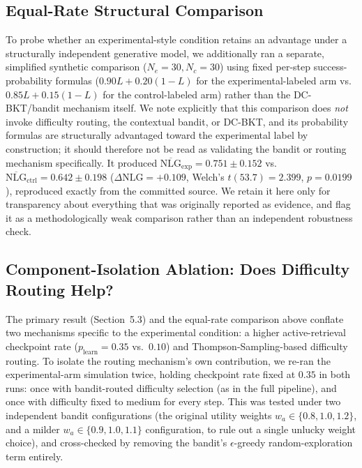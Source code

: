 \documentclass[notitlepage,12pt]{jedm}
\begin{document}
\subsection{Equal-Rate Structural Comparison}
To probe whether an experimental-style condition retains an advantage under a structurally independent generative model, we additionally ran a separate, simplified synthetic comparison ($N_e=30, N_c=30$) using fixed per-step success-probability formulas ($0.90L + 0.20(1-L)$ for the experimental-labeled arm vs.\ $0.85L + 0.15(1-L)$ for the control-labeled arm) rather than the DC-BKT/bandit mechanism itself. We note explicitly that this comparison does \emph{not} invoke difficulty routing, the contextual bandit, or DC-BKT, and its probability formulas are structurally advantaged toward the experimental label by construction; it should therefore not be read as validating the bandit or routing mechanism specifically. It produced $\overline{\text{NLG}}_{\text{exp}} = 0.751 \pm 0.152$ vs.\ $\overline{\text{NLG}}_{\text{ctrl}} = 0.642 \pm 0.198$ ($\Delta\text{NLG}=+0.109$, Welch's $t(53.7)=2.399$, $p=0.0199$), reproduced exactly from the committed source. We retain it here only for transparency about everything that was originally reported as evidence, and flag it as a methodologically weak comparison rather than an independent robustness check.

\subsection{Component-Isolation Ablation: Does Difficulty Routing Help?}
The primary result (Section~5.3) and the equal-rate comparison above conflate two mechanisms specific to the experimental condition: a higher active-retrieval checkpoint rate ($p_{\text{learn}}=0.35$ vs.\ $0.10$) and Thompson-Sampling-based difficulty routing. To isolate the routing mechanism's own contribution, we re-ran the experimental-arm simulation twice, holding checkpoint rate fixed at $0.35$ in both runs: once with bandit-routed difficulty selection (as in the full pipeline), and once with difficulty fixed to medium for every step. This was tested under two independent bandit configurations (the original utility weights $w_a \in \{0.8, 1.0, 1.2\}$, and a milder $w_a \in \{0.9, 1.0, 1.1\}$ configuration, to rule out a single unlucky weight choice), and cross-checked by removing the bandit's $\epsilon$-greedy random-exploration term entirely.
\end{document}
